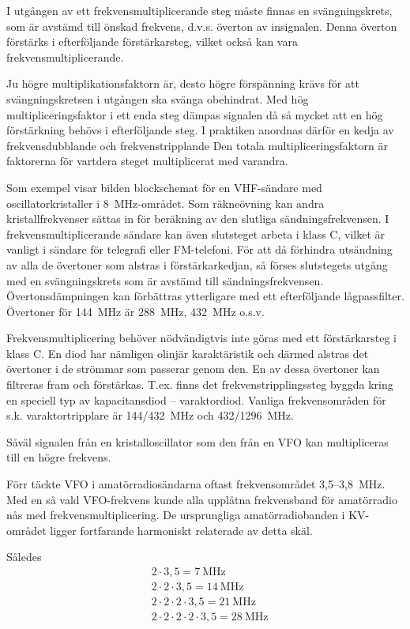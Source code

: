I utgången av ett frekvensmultiplicerande steg måste finnas en
svängningskrets, som är avstämd till önskad frekvens, d.v.s. överton
av insignalen. Denna överton förstärks i efterföljande förstärkarsteg,
vilket också kan vara frekvensmultiplicerande.

Ju högre multiplikationsfaktorn är, desto högre förspänning krävs för
att svängningskretsen i utgången ska svänga obehindrat.  Med hög
multipliceringsfaktor i ett enda steg dämpas signalen då så mycket att
en hög förstärkning behövs i efterföljande steg. I praktiken anordnas
därför en kedja av frekvensdubblande och frekvenstripplande Den totala
multipliceringsfaktorn är faktorerna för vartdera steget multiplicerat
med varandra.

Som exempel visar bilden blockschemat för en VHF-sändare med
oscillatorkristaller i 8~MHz-området. Som räkneövning kan andra
kristallfrekvenser sättas in för beräkning av den slutliga
sändningsfrekvensen. I frekvensmultiplicerande sändare kan även
slutsteget arbeta i klass C, vilket är vanligt i sändare för telegrafi
eller FM-telefoni. För att då förhindra utsändning av alla de
övertoner som alstras i förstärkarkedjan, så förses slutstegets utgång
med en svängningskrets som är avstämd till sändningsfrekvensen.
Övertonsdämpningen kan förbättras ytterligare med ett efterföljande
lågpassfilter. Övertoner för 144~MHz är 288~MHz, 432~MHz o.s.v.

Frekvensmultiplicering behöver nödvändigtvis inte göras med ett
förstärkarsteg i klass C. En diod har nämligen olinjär karaktäristik
och därmed alstras det övertoner i de strömmar som passerar genom
den. En av dessa övertoner kan filtreras fram och
förstärkas. T.ex. finns det frekvenstripplingssteg byggda kring en
speciell typ av kapacitansdiod -- varaktordiod. Vanliga frekvensområden
för s.k. varaktortripplare är 144/432~MHz och 432/1296~MHz.

Såväl signalen från en kristalloscillator som den från en VFO kan
multipliceras till en högre frekvens.

Förr täckte VFO i amatörradiosändarna oftast frekvensområdet 3,5--3,8~MHz.
Med en så vald VFO-frekvens kunde alla upplåtna frekvensband för
amatörradio nås med frekvensmultiplicering. De ursprungliga
amatörradiobanden i KV-området ligger fortfarande harmoniskt
relaterade av detta skäl.

Således
\begin{align*}
  &2 \cdot 3,5 = 7\ \text{MHz} \\
  &2 \cdot 2 \cdot 3,5 = 14\ \text{MHz} \\
  &2 \cdot 2 \cdot 2 \cdot 3,5 = 21\ \text{MHz} \\
  &2 \cdot 2 \cdot 2 \cdot 2 \cdot 3,5 = 28\ \text{MHz} \\
\end{align*}

